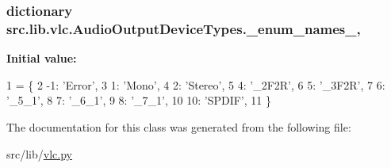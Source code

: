 \subsubsection[{\+\_\+enum\+\_\+names\+\_\+}]{\setlength{\rightskip}{0pt plus 5cm}dictionary src.\+lib.\+vlc.\+Audio\+Output\+Device\+Types.\+\_\+enum\+\_\+names\+\_\+\hspace{0.3cm}{\ttfamily [static]}, {\ttfamily [private]}}\label{classsrc_1_1lib_1_1vlc_1_1AudioOutputDeviceTypes_a8a1417d077523d4052c95707a6f1a16d}
{\bfseries Initial value\+:}
\begin{DoxyCode}
1 = \{
2         -1: \textcolor{stringliteral}{'Error'},
3         1: \textcolor{stringliteral}{'Mono'},
4         2: \textcolor{stringliteral}{'Stereo'},
5         4: \textcolor{stringliteral}{'\_2F2R'},
6         5: \textcolor{stringliteral}{'\_3F2R'},
7         6: \textcolor{stringliteral}{'\_5\_1'},
8         7: \textcolor{stringliteral}{'\_6\_1'},
9         8: \textcolor{stringliteral}{'\_7\_1'},
10         10: \textcolor{stringliteral}{'SPDIF'},
11     \}
\end{DoxyCode}


The documentation for this class was generated from the following file\+:\begin{DoxyCompactItemize}
\item 
src/lib/\hyperlink{vlc_8py}{vlc.\+py}\end{DoxyCompactItemize}
